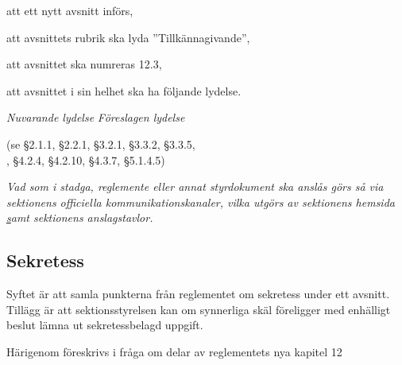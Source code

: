 \documentclass{article}
\newenvironment{lydelse}
    {\begin{paracol}{2}%
        \emph{Nuvarande lydelse}%
        \switchcolumn%
        \emph{Föreslagen lydelse}%
    \end{paracol}%
    \begin{enumerate}[label=\thesubsection.\arabic*]%
    \begin{paracol}{2}%
    }{\end{paracol}\end{enumerate}}
\begin{document}
\begin{dels}
    \item att ett nytt avsnitt införs,
    \item att avsnittets rubrik ska lyda ''Tillkännagivande'',
    \item att avsnittet ska numreras 12.3,
    \item att avsnittet i sin helhet ska ha följande lydelse.
\end{dels}
\begin{lydelse}
    
    \item[] (se \S2.1.1, \S2.2.1, \S3.2.1, \S3.3.2, \S3.3.5, \\, \S4.2.4, \S4.2.10, \S4.3.7, \S 5.1.4.5)
    
    \switchcolumn
  
    \item \emph{Vad som i stadga, reglemente eller annat styrdokument ska anslås görs så via sektionens officiella kommunikationskanaler, vilka utgörs av sektionens hemsida \href{ftek.se} samt sektionens anslagstavlor.}

\end{lydelse}
\subsection{Sekretess}
\label{R:sekretess}
Syftet är att samla punkterna från reglementet om sekretess under ett avsnitt. 
Tillägg är att sektionsstyrelsen kan om synnerliga skäl föreligger med enhälligt beslut lämna ut sekretessbelagd uppgift.

Härigenom föreskrivs i fråga om delar av reglementets nya kapitel 12
\end{document}
